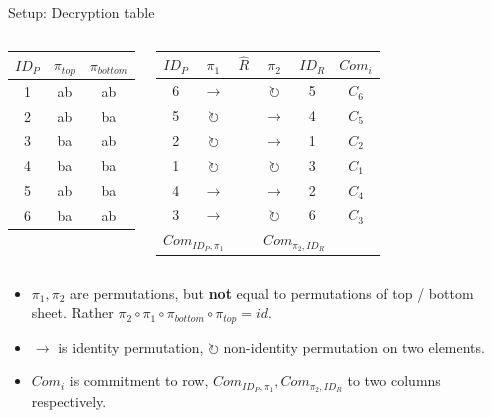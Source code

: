 \documentclass{beamer}
\begin{document}
\begin{frame}{Setup: Decryption table}
	\begin{columns}
		\begin{center}
			\begin{tabular}{|c|c|c|}
				\hline
				$ID_P$ & $\pi_{top}$ & $\pi_{bottom}$ \\
				\hline
				1 & ab & ab \\
				2 & ab & ba \\
				3 & ba & ab \\
				4 & ba & ba \\
				5 & ab & ba \\
				6 & ba & ab \\
				\hline
			\end{tabular}
		\end{center}

		\begin{center}
			\begin{tabular}{|c|c|c|c|c|c|}
				\hline
				$ID_P$ & $\pi_1$ & $\hat{R}$ & $\pi_2$ & $ID_R$ & $Com_{i}$ \\
				\hline
				6 & $\rightarrow$       & & $\circlearrowright$ & 5 & $C_6$ \\
				5 & $\circlearrowright$ & & $\rightarrow$       & 4 & $C_5$ \\
				2 & $\circlearrowright$ & & $\rightarrow$       & 1 & $C_2$ \\
				1 & $\circlearrowright$ & & $\circlearrowright$ & 3 & $C_1$ \\
				4 & $\rightarrow$       & & $\rightarrow$       & 2 & $C_4$ \\
				3 & $\rightarrow$       & & $\circlearrowright$ & 6 & $C_3$ \\
				\hline
				\multicolumn{2}{|c|}{$Com_{ID_P, \pi_1}$} &   & \multicolumn{2}{c|}{$Com_{\pi_2, ID_R}$} & \\
				\hline
			\end{tabular}
		\end{center}
	\end{columns}

	\begin{itemize}
		\item $\pi_1, \pi_2$ are permutations, but \textbf{not}
			equal to permutations of top / bottom sheet. Rather
			$\pi_{2} \circ \pi_{1} \circ \pi_{bottom} \circ \pi_{top} = id$.
		\item $\rightarrow$ is identity permutation,
			$\circlearrowright$ non-identity permutation on two
			elements.
		\item $Com_{i}$ is commitment to row, $Com_{ID_P, \pi_1},
			Com_{\pi_2, ID_R}$ to two columns respectively.
	\end{itemize}
\end{frame}
\end{document}
